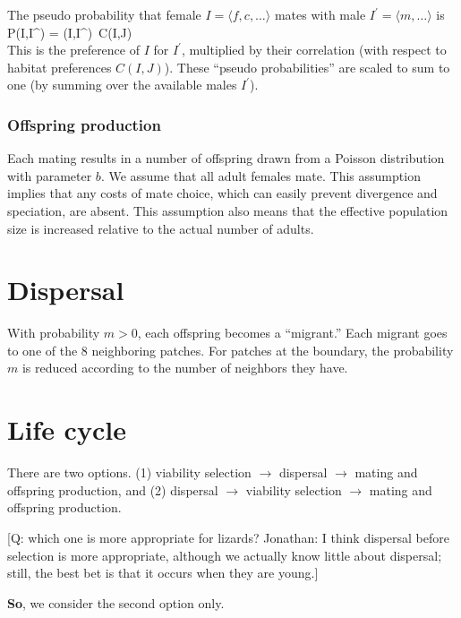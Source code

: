 \documentclass{article}
\begin{document}
The pseudo probability that female
$I = \langle f,c,\ldots \rangle$ mates with male $I^{\prime}= \langle m,\ldots \rangle$ is
\be
P(I,I^{\prime}) = \psi(I,I^{\prime})\ C(I,J) \\
\ee
This is the preference of $I$ for $I^{\prime}$, multiplied by their
correlation (with respect to habitat preferences $C(I,J)$).  These ``pseudo
probabilities'' are scaled to sum to one (by summing over the available males $I^\prime$).


\subsubsection{Offspring production}

Each mating results in a number of offspring drawn from a Poisson distribution with parameter $b$.
We assume that all adult females mate. This assumption implies that any costs of mate choice,
which can easily prevent divergence and speciation, are absent.
This assumption also means that the effective population size is increased relative to the actual
number of adults. 
\section{Dispersal}


With probability $m>0$, each offspring becomes a ``migrant.''
Each migrant goes to one of the 8 neighboring patches.
For patches at the boundary, the probability $m$ is reduced according 
to the number of neighbors they have.


\section{Life cycle}

There are two options. (1) viability selection $\rightarrow$ dispersal
$\rightarrow$ mating and offspring production, and (2) dispersal
$\rightarrow$ viability selection $\rightarrow$ mating and offspring production.

{\footnotesize [Q: which one is more appropriate for lizards? Jonathan:
I think dispersal before selection is more appropriate, although we actually know little about dispersal; still, the best bet is that it occurs when they are young.]}

{\bf So}, we consider the second option only.
\end{document}
